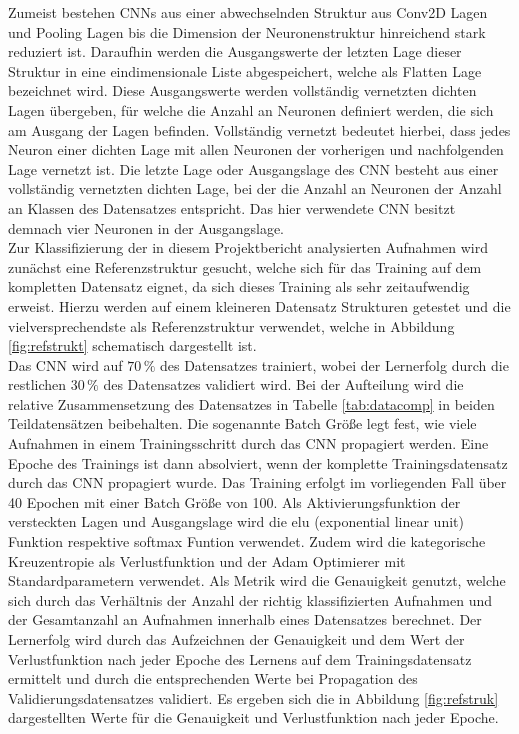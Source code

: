 Zumeist bestehen CNNs aus einer abwechselnden Struktur aus Conv2D Lagen und Pooling Lagen bis die Dimension der Neuronenstruktur hinreichend stark reduziert ist. Daraufhin werden die Ausgangswerte der letzten Lage dieser Struktur in eine eindimensionale Liste abgespeichert, welche als Flatten Lage bezeichnet wird. Diese Ausgangswerte werden vollständig vernetzten dichten Lagen übergeben, für welche die Anzahl an Neuronen definiert werden, die sich am Ausgang der Lagen befinden. Vollständig vernetzt bedeutet hierbei, dass jedes Neuron einer dichten Lage mit allen Neuronen der vorherigen und nachfolgenden Lage vernetzt ist. Die letzte Lage oder Ausgangslage des CNN besteht aus einer vollständig vernetzten dichten Lage, bei der die Anzahl an Neuronen der Anzahl an Klassen des Datensatzes entspricht. Das hier verwendete CNN besitzt demnach vier Neuronen in der Ausgangslage. \\ 
Zur Klassifizierung der in diesem Projektbericht analysierten Aufnahmen wird zunächst eine Referenzstruktur gesucht, welche sich für das Training auf dem kompletten Datensatz eignet, da sich dieses Training als sehr zeitaufwendig erweist. Hierzu werden auf einem kleineren Datensatz Strukturen getestet und die vielversprechendste als Referenzstruktur verwendet, welche in Abbildung \ref{fig:refstrukt} schematisch dargestellt ist. \\
Das CNN wird auf $70\,\%$ des Datensatzes trainiert, wobei der Lernerfolg durch die restlichen $30\,\%$ des Datensatzes validiert wird. Bei der Aufteilung wird die relative Zusammensetzung des Datensatzes  in Tabelle \ref{tab:datacomp} in beiden Teildatensätzen beibehalten. Die sogenannte Batch Grö{\ss}e legt fest, wie viele Aufnahmen in einem Trainingsschritt durch das CNN propagiert werden. Eine Epoche des Trainings ist dann absolviert, wenn der komplette Trainingsdatensatz durch das CNN propagiert wurde. Das Training erfolgt im vorliegenden Fall über 40 Epochen mit einer Batch Grö{\ss}e von 100. Als Aktivierungsfunktion der versteckten Lagen und Ausgangslage wird die elu (exponential linear unit) Funktion respektive softmax Funtion verwendet. Zudem wird die kategorische Kreuzentropie als Verlustfunktion und der Adam Optimierer \cite{Adam} mit Standardparametern verwendet. Als Metrik wird die Genauigkeit genutzt, welche sich durch das Verhältnis der Anzahl der richtig klassifizierten Aufnahmen und der Gesamtanzahl an Aufnahmen innerhalb eines Datensatzes berechnet. Der Lernerfolg wird durch das Aufzeichnen der Genauigkeit und dem Wert der Verlustfunktion nach jeder Epoche des Lernens auf dem Trainingsdatensatz ermittelt und durch die entsprechenden Werte bei Propagation des Validierungsdatensatzes validiert. Es ergeben sich die in Abbildung \ref{fig:refstruk} dargestellten Werte für die Genauigkeit und Verlustfunktion nach jeder Epoche.\\
